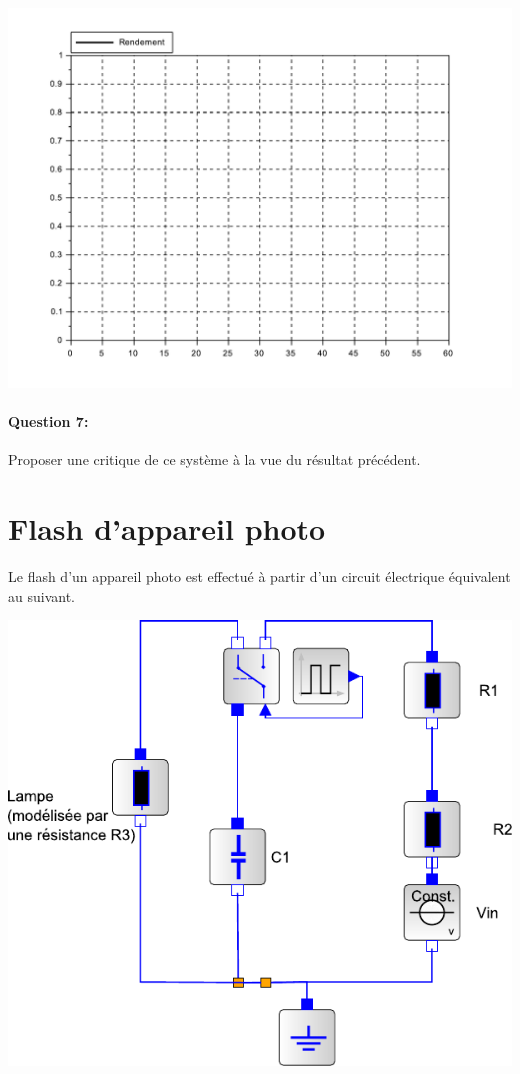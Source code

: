 \begin{center}
 \includegraphics[width=0.8\linewidth]{img/Rendement_vide}
\end{center}

\paragraph{Question 7:} Proposer une critique de ce système à la vue du résultat précédent.

\newpage

\section{Flash d'appareil photo}

Le flash d'un appareil photo est effectué à partir d'un circuit électrique équivalent au suivant.

\begin{center}
 \includegraphics[width=0.5\linewidth]{img/Flash_xcos}
\end{center}

